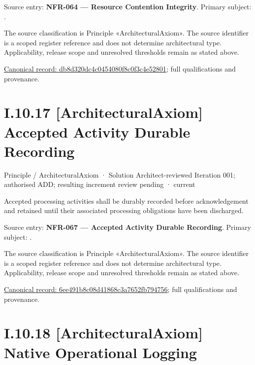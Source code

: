 Source entry: \textbf{NFR-064 — Resource Contention Integrity}. Primary subject: \texttt{}.



The source classification is Principle «ArchitecturalAxiom». The source identifier is a scoped register reference and does not determine architectural type. Applicability, release scope and unresolved thresholds remain as stated above.


{\footnotesize \href{../../../../continuum/motivation/principle/architectural-axiom/db8d320dc4c0454080f8c0f3c4e52801.md}{Canonical record: db8d320dc4c0454080f8c0f3c4e52801}; full qualifications and provenance.}\par
\section*{I.10.17 [ArchitecturalAxiom] Accepted Activity Durable Recording}
\label{navigation:I.10.17}

\label{element:6ee491b8c08d41868c3a7652fb794756}
{\small Principle / ArchitecturalAxiom · Solution Architect-reviewed Iteration 001; authorised ADD; resulting increment review pending · current}\par

Accepted processing activities shall be durably recorded before acknowledgement and retained until their associated processing obligations have been discharged.



Source entry: \textbf{NFR-067 — Accepted Activity Durable Recording}. Primary subject: \texttt{}.



The source classification is Principle «ArchitecturalAxiom». The source identifier is a scoped register reference and does not determine architectural type. Applicability, release scope and unresolved thresholds remain as stated above.


{\footnotesize \href{../../../../continuum/motivation/principle/architectural-axiom/6ee491b8c08d41868c3a7652fb794756.md}{Canonical record: 6ee491b8c08d41868c3a7652fb794756}; full qualifications and provenance.}\par
\section*{I.10.18 [ArchitecturalAxiom] Native Operational Logging}
\label{navigation:I.10.18}

